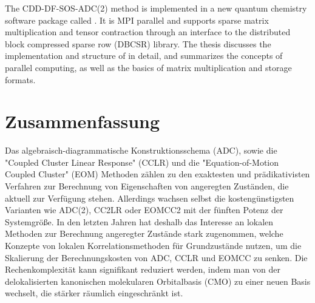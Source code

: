 The CDD-DF-SOS-ADC(2) method is implemented in a new quantum chemistry software package called \mchem{}. It is MPI parallel and supports sparse matrix multiplication and tensor contraction through an interface to the distributed block compressed sparse row (DBCSR) library. The thesis discusses the implementation and structure of \mchem{} in detail, and summarizes the concepts of parallel computing, as well as the basics of matrix multiplication and storage formats.

\nonewpage

\chapter*{Zusammenfassung}

Das algebraisch-diagrammatische Konstruktionsschema (ADC), sowie die "{}Coupled Cluster Linear Response"{} (CCLR) und die "{}Equation-of-Motion Coupled Cluster"{} (EOM) Methoden zählen zu den exaktesten und prädikativisten Verfahren zur Berechnung von Eigenschaften von angeregten Zuständen, die aktuell zur Verfügung stehen. 
Allerdings wachsen selbst die kostengünstigsten Varianten wie ADC(2), CC2LR oder EOMCC2 mit der fünften Potenz der Systemgrö{\ss}e.
In den letzten Jahren hat deshalb das Interesse an lokalen Methoden zur Berechnung angeregter Zustände stark zugenommen, welche Konzepte von lokalen Korrelationsmethoden für Grundzustände nutzen, um die Skalierung der Berechnungskosten von ADC, CCLR und EOMCC zu senken. 
Die Rechenkomplexität kann signifikant reduziert werden, indem man von der delokalisierten kanonischen molekularen Orbitalbasis (CMO) zu einer neuen Basis wechselt, die stärker räumlich eingeschränkt ist. 
